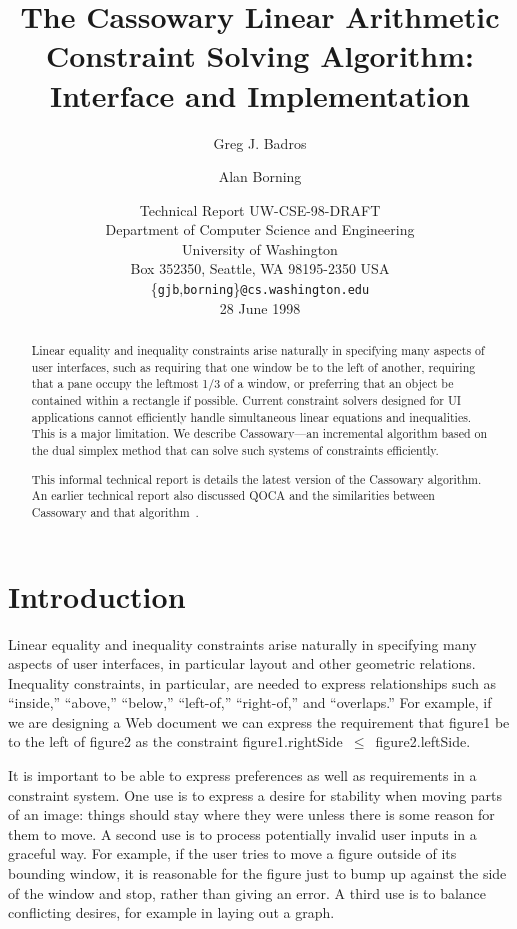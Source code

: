 \documentclass{article}
\title{The Cassowary Linear Arithmetic Constraint Solving Algorithm:
  Interface and Implementation}
\author{Greg J. Badros \and Alan Borning}
\date{Technical Report UW-CSE-98-DRAFT \\
Department of Computer Science and Engineering \\
University of Washington \\
Box 352350, Seattle, WA  98195-2350  USA \\
{\small \{{\tt gjb},{\tt borning}\}{\tt @cs.washington.edu}} \\
\vspace{2mm}
28 June 1998}
\newcommand{\code}{\small\sf}
\begin{document}
\maketitle

\begin{abstract}
Linear equality and inequality constraints arise naturally in specifying
many aspects of user interfaces, such as requiring that one window be to
the left of another, requiring that a pane occupy the leftmost 1/3 of a
window, or preferring that an object be contained within a rectangle if
possible.  Current constraint solvers designed for UI applications cannot
efficiently handle simultaneous linear equations and inequalities.  This is
a major limitation.  We describe Cassowary---an incremental algorithm based on the dual
simplex method that can solve such systems of constraints
efficiently.

This informal technical report is details the latest version of the
Cassowary algorithm.  An earlier technical report also
discussed QOCA and the similarities between Cassowary and that
algorithm~\cite{borning-simplex-tr}.
\end{abstract}

\bigskip

\section{Introduction}

Linear equality and inequality constraints arise naturally in specifying
many aspects of user interfaces, in particular layout and other geometric
relations.  Inequality constraints, in particular, are needed to express
relationships such as ``inside,'' ``above,'' ``below,'' ``left-of,''
``right-of,'' and ``overlaps.''  For example, if we are designing a
Web document we can express the
requirement that {\code figure1} be to the left of {\code figure2} as the
constraint \mbox{\code figure1.rightSide $\leq$ figure2.leftSide}.

It is important to be able to express preferences as well as requirements
in a constraint system.  One use is to express a desire for stability
when moving parts of an image: things should stay where they were unless
there is some reason for them to move.  A second use is to process
potentially invalid user inputs in a graceful way.  For example, if the
user tries to move a figure outside of its bounding window, it is
reasonable for the figure just to bump up against the side of the window
and stop, rather than giving an error.  A
third use is to balance conflicting desires, for example in laying out a
graph.
\end{document}
